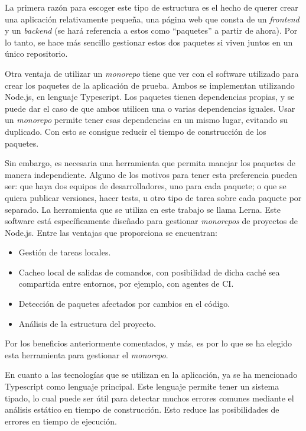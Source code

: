 La primera razón para escoger este tipo de estructura es el hecho de querer crear una aplicación relativamente pequeña, una página web que consta de un \textit{frontend} y un \textit{backend} (se hará referencia a estos como ``paquetes'' a partir de ahora). Por lo tanto, se hace más sencillo gestionar estos dos paquetes si viven juntos en un único repositorio.

Otra ventaja de utilizar un \textit{monorepo} tiene que ver con el software utilizado para crear los paquetes de la aplicación de prueba. Ambos se implementan utilizando Node.js, en lenguaje Typescript\cite{ts}. Los paquetes tienen dependencias propias, y se puede dar el caso de que ambos utilicen una o varias dependencias iguales. Usar un \textit{monorepo} permite tener esas dependencias en un mismo lugar, evitando su duplicado. Con esto se consigue reducir el tiempo de construcción de los paquetes.

Sin embargo, es necesaria una herramienta que permita manejar los paquetes de manera independiente. Alguno de los motivos para tener esta preferencia pueden ser: que haya dos equipos de desarrolladores, uno para cada paquete; o que se quiera publicar versiones, hacer tests, u otro tipo de tarea sobre cada paquete por separado. La herramienta que se utiliza en este trabajo se llama Lerna\cite{lerna}. Este software está específicamente diseñado para gestionar \textit{monorepos} de proyectos de Node.js. Entre las ventajas que proporciona se encuentran:

\begin{itemize}
  \item Gestión de tareas locales.
  \item Cacheo local de salidas de comandos, con posibilidad de dicha caché sea compartida entre entornos, por ejemplo, con agentes de CI.
  \item Detección de paquetes afectados por cambios en el código.
  \item Análisis de la estructura del proyecto.
\end{itemize}

Por los beneficios anteriormente comentados, y más, es por lo que se ha elegido esta herramienta para gestionar el \textit{monorepo}.

En cuanto a las tecnologías que se utilizan en la aplicación, ya se ha mencionado Typescript como lenguaje principal. Este lenguaje permite tener un sistema tipado, lo cual puede ser útil para detectar muchos errores comunes mediante el análisis estático en tiempo de construcción. Esto reduce las posibilidades de errores en tiempo de ejecución.

